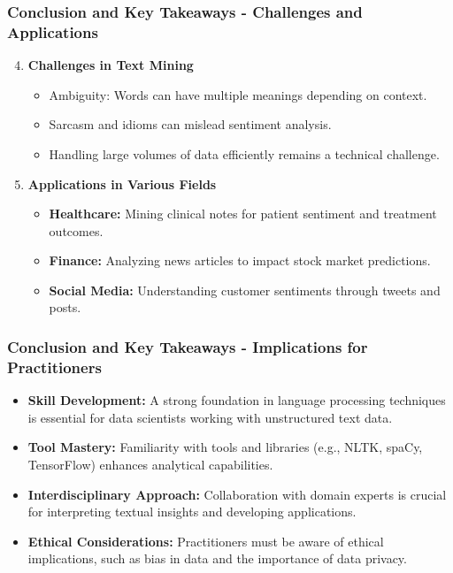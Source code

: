 \documentclass[aspectratio=169]{beamer}
\begin{document}
\begin{frame}[fragile]
    \frametitle{Conclusion and Key Takeaways - Challenges and Applications}

    \begin{enumerate}
        \setcounter{enumi}{3} %
        \item \textbf{Challenges in Text Mining}  
        \begin{itemize}
            \item Ambiguity: Words can have multiple meanings depending on context.
            \item Sarcasm and idioms can mislead sentiment analysis.
            \item Handling large volumes of data efficiently remains a technical challenge.
        \end{itemize}

        \item \textbf{Applications in Various Fields}  
        \begin{itemize}
            \item \textbf{Healthcare:} Mining clinical notes for patient sentiment and treatment outcomes.
            \item \textbf{Finance:} Analyzing news articles to impact stock market predictions.
            \item \textbf{Social Media:} Understanding customer sentiments through tweets and posts.
        \end{itemize}
    \end{enumerate}
\end{frame}

\begin{frame}[fragile]
    \frametitle{Conclusion and Key Takeaways - Implications for Practitioners}

    \begin{itemize}
        \item \textbf{Skill Development:} A strong foundation in language processing techniques is essential for data scientists working with unstructured text data.
        \item \textbf{Tool Mastery:} Familiarity with tools and libraries (e.g., NLTK, spaCy, TensorFlow) enhances analytical capabilities.
        \item \textbf{Interdisciplinary Approach:} Collaboration with domain experts is crucial for interpreting textual insights and developing applications.
        \item \textbf{Ethical Considerations:} Practitioners must be aware of ethical implications, such as bias in data and the importance of data privacy.
    \end{itemize}
\end{frame}
\end{document}
